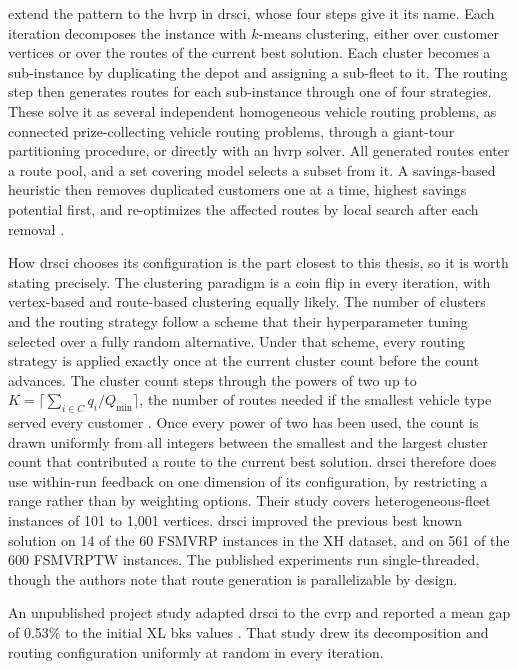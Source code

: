 \citet{kerscherSolvingHeterogeneousVehicle} extend the pattern to the \gls{hvrp} in \gls{drsci}, whose four steps give it its name. Each iteration decomposes the instance with $k$-means clustering, either over customer vertices or over the routes of the current best solution. Each cluster becomes a sub-instance by duplicating the depot and assigning a sub-fleet to it. The routing step then generates routes for each sub-instance through one of four strategies. These solve it as several independent homogeneous vehicle routing problems, as connected prize-collecting vehicle routing problems, through a giant-tour partitioning procedure, or directly with an \gls{hvrp} solver. All generated routes enter a route pool, and a set covering model selects a subset from it. A savings-based heuristic then removes duplicated customers one at a time, highest savings potential first, and re-optimizes the affected routes by local search after each removal \citep[Algorithm~3]{kerscherSolvingHeterogeneousVehicle}.

How \gls{drsci} chooses its configuration is the part closest to this thesis, so it is worth stating precisely. The clustering paradigm is a coin flip in every iteration, with vertex-based and route-based clustering equally likely. The number of clusters and the routing strategy follow a scheme that their hyperparameter tuning selected over a fully random alternative. Under that scheme, every routing strategy is applied exactly once at the current cluster count before the count advances. The cluster count steps through the powers of two up to $K = \lceil \sum_{i \in C} q_i / Q_{\min} \rceil$, the number of routes needed if the smallest vehicle type served every customer \citep[Eq.~41]{kerscherSolvingHeterogeneousVehicle}. Once every power of two has been used, the count is drawn uniformly from all integers between the smallest and the largest cluster count that contributed a route to the current best solution. \gls{drsci} therefore does use within-run feedback on one dimension of its configuration, by restricting a range rather than by weighting options. Their study covers heterogeneous-fleet instances of 101 to 1{,}001 vertices. \gls{drsci} improved the previous best known solution on 14 of the 60 FSMVRP instances in the XH dataset, and on 561 of the 600 FSMVRPTW instances. The published experiments run single-threaded, though the authors note that route generation is parallelizable by design.

An unpublished project study adapted \gls{drsci} to the \gls{cvrp} and reported a mean gap of 0.53\% to the initial XL \gls{bks} values \citep{altendeiteringDRSCICVRP2026}. That study drew its decomposition and routing configuration uniformly at random in every iteration.

